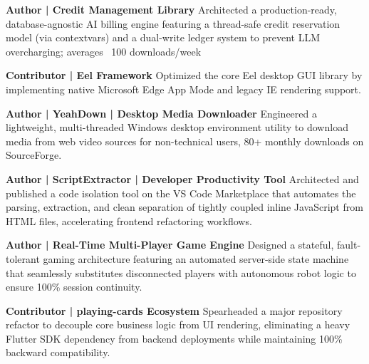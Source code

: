 



\begin{cventries}

 	\skillOverride
	{
		\begin{cvitems} %
			\item{\textbf{Author | Credit Management Library \rightarrow} Architected a production-ready, database-agnostic AI billing engine featuring a thread-safe credit reservation model (via contextvars) and a dual-write ledger system to prevent LLM overcharging; averages ~100 downloads/week}
            \item{\textbf{Contributor | Eel Framework \rightarrow} Optimized the core Eel desktop GUI library by implementing native Microsoft Edge App Mode and legacy IE rendering support.}
            \item{\textbf{Author | YeahDown | Desktop Media Downloader \rightarrow} Engineered a lightweight, multi-threaded Windows desktop environment utility to download media from web video sources for non-technical users, 80+ monthly downloads on SourceForge.}
            \item{\textbf{Author | ScriptExtractor | Developer Productivity Tool \rightarrow} Architected and published a code isolation tool on the VS Code Marketplace that automates the parsing, extraction, and clean separation of tightly coupled inline JavaScript from HTML files, accelerating frontend refactoring workflows.}
            \item{\textbf{Author | Real-Time Multi-Player Game Engine \rightarrow} Designed a stateful, fault-tolerant gaming architecture featuring an automated server-side state machine that seamlessly substitutes disconnected players with autonomous robot logic to ensure 100\% session continuity.}
            \item{\textbf{Contributor | playing-cards Ecosystem \rightarrow} Spearheaded a major repository refactor to decouple core business logic from UI rendering, eliminating a heavy Flutter SDK dependency from backend deployments while maintaining 100\% backward compatibility.}
		\end{cvitems}
	}

\end{cventries}
